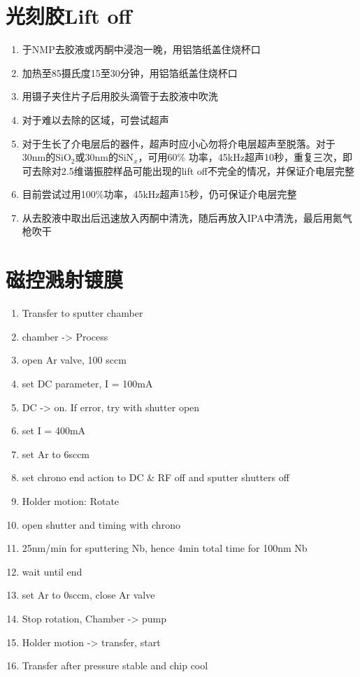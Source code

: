 \section{光刻胶Lift off} %
\label{sec:光刻胶lift_off}
        \begin{enumerate}
            \item 于NMP去胶液或丙酮中浸泡一晚，用铝箔纸盖住烧杯口
            \item 加热至85摄氏度15至30分钟，用铝箔纸盖住烧杯口
            \item 用镊子夹住片子后用胶头滴管于去胶液中吹洗
            \item 对于难以去除的区域，可尝试超声
            \item 对于生长了介电层后的器件，超声时应小心勿将介电层超声至脱落。对于30nm的SiO$_2$或30nm的SiN$_x$，可用60\% 功率，45kHz超声10秒，重复三次，即可去除对2.5维谐振腔样品可能出现的lift off不完全的情况，并保证介电层完整
            \item 目前尝试过用100\%功率，45kHz超声15秒，仍可保证介电层完整
            \item 从去胶液中取出后迅速放入丙酮中清洗，随后再放入IPA中清洗，最后用氮气枪吹干
        \end{enumerate}

\section{磁控溅射镀膜} %
\label{sec:磁控溅射镀膜}
    \begin{enumerate}        
        \item Transfer to sputter chamber
        \item chamber -> Process
        \item open Ar valve, 100 sccm
        \item set DC parameter, I = 100mA
        \item DC -> on. If error, try with shutter open
        \item set I = 400mA
        \item set Ar to 6sccm
        \item set chrono end action to DC \& RF off and sputter shutters off
        \item Holder motion: Rotate
        \item open shutter and timing with chrono
        \item 25nm/min for sputtering Nb, hence 4min total time for 100nm Nb
        \item wait until end
        \item set Ar to 0sccm, close Ar valve
        \item Stop rotation, Chamber -> pump
        \item Holder motion -> transfer, start
        \item Transfer after pressure stable and chip cool
    \end{enumerate}

